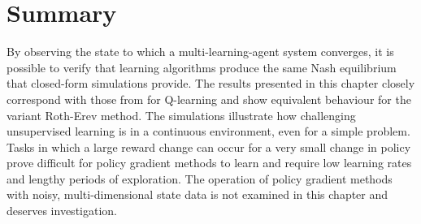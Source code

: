 \section{Summary}
By observing the state to which a multi-learning-agent system converges, it is
possible to verify that learning algorithms produce the same Nash equilibrium
that closed-form simulations provide.  The results presented in this chapter
closely correspond with those from  for Q-learning and show
equivalent behaviour for the variant Roth-Erev method.  The simulations
illustrate how challenging unsupervised learning is in a continuous environment,
even for a simple problem. Tasks in which a large reward change can occur for a
very small change in policy prove difficult for policy gradient methods to learn
and require low learning rates and lengthy periods of exploration.  The
operation of policy gradient methods with noisy, multi-dimensional state data is
not examined in this chapter and deserves investigation.

%




